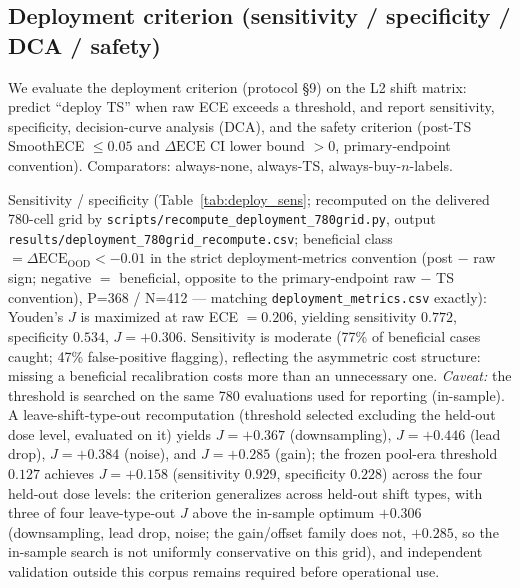 \documentclass[final,5p,times,nonatbib]{elsarticle}
\begin{document}
\subsection{Deployment criterion (sensitivity / specificity / DCA / safety)}
\label{sec:deployment}
We evaluate the deployment criterion (protocol \S9) on the L2 shift
matrix: predict ``deploy TS'' when raw ECE exceeds a threshold, and
report sensitivity, specificity, decision-curve analysis (DCA), and the
safety criterion (post-TS SmoothECE $\leq 0.05$ and $\Delta\text{ECE}$ CI
lower bound $>0$, primary-endpoint convention). Comparators: always-none,
always-TS, always-buy-$n$-labels.

Sensitivity / specificity (Table~\ref{tab:deploy_sens}; recomputed on the
delivered 780-cell grid by
\texttt{scripts/recompute\_deployment\_780grid.py}, output
\texttt{results/deployment\_780grid\_recompute.csv}; beneficial class
$=\Delta\text{ECE}_{\text{OOD}}<-0.01$ in the strict deployment-metrics
convention (post $-$ raw sign; negative $=$ beneficial, opposite to the
primary-endpoint raw $-$ TS convention), P=368 / N=412 --- matching \texttt{deployment\_metrics.csv}
exactly): Youden's $J$ is maximized at raw ECE $=0.206$, yielding
sensitivity $0.772$, specificity $0.534$, $J=+0.306$. Sensitivity is
moderate (77\% of beneficial cases caught; 47\% false-positive
flagging), reflecting the asymmetric cost structure: missing a
beneficial recalibration costs more than an unnecessary one.
\emph{Caveat:} the threshold is searched on the same 780 evaluations used
for reporting (in-sample). A leave-shift-type-out recomputation (threshold
selected excluding the held-out dose level, evaluated on it) yields
$J=+0.367$ (downsampling), $J=+0.446$ (lead drop), $J=+0.384$
(noise), and $J=+0.285$ (gain); the frozen pool-era threshold $0.127$
achieves $J=+0.158$ (sensitivity $0.929$, specificity $0.228$) across the
four held-out dose levels: the criterion generalizes across held-out
shift types, with three of four leave-type-out $J$ above the in-sample
optimum $+0.306$ (downsampling, lead drop, noise; the gain/offset
family does not, $+0.285$, so the in-sample search is not uniformly
conservative on this grid), and independent
validation outside this corpus remains required before operational use.
\end{document}
